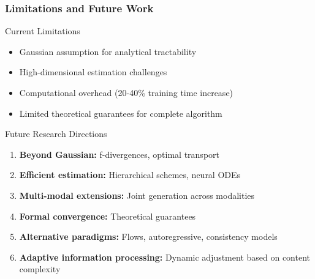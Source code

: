 \documentclass[aspectratio=169]{beamer}
\begin{document}
\begin{frame}
\frametitle{Limitations and Future Work}
\begin{block}{Current Limitations}
\begin{itemize}
\item \textcolor{myred}{Gaussian assumption} for analytical tractability
\item \textcolor{myred}{High-dimensional estimation challenges}
\item \textcolor{myred}{Computational overhead} (20-40\% training time increase)
\item \textcolor{myred}{Limited theoretical guarantees} for complete algorithm
\end{itemize}
\end{block}

\begin{block}{Future Research Directions}
\begin{enumerate}
\item \textbf{Beyond Gaussian:} f-divergences, optimal transport
\item \textbf{Efficient estimation:} Hierarchical schemes, neural ODEs
\item \textbf{Multi-modal extensions:} Joint generation across modalities
\item \textbf{Formal convergence:} Theoretical guarantees
\item \textbf{Alternative paradigms:} Flows, autoregressive, consistency models
\item \textbf{Adaptive information processing:} Dynamic adjustment based on content complexity
\end{enumerate}
\end{block}
\end{frame}
\end{document}
